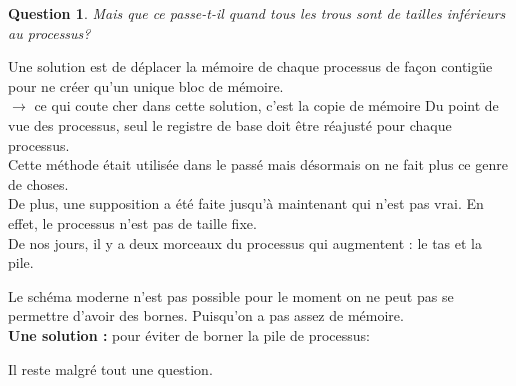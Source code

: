 \documentclass[12pt,a4paper]{report}
\newtheorem*{q}{Question}
\begin{document}
\begin{q}Mais que ce passe-t-il quand tous les trous sont de tailles inférieurs au processus?\end{q}
Une solution est de déplacer la mémoire de chaque processus de façon contigüe pour ne créer qu'un unique bloc de mémoire.\\
$\rightarrow$ ce qui coute cher dans cette solution, c'est la copie de mémoire  Du point de vue des processus, seul le registre de base doit être réajusté pour chaque processus.\\
Cette méthode était utilisée dans le passé mais désormais on
ne fait plus ce genre de choses.\\

De plus, une supposition a été faite jusqu'à maintenant qui n'est pas vrai. En effet, le processus n'est pas de taille fixe.\\
De nos jours, il y a deux morceaux du processus qui augmentent : le tas et la pile. \\

\begin{center}
\end{center}

Le schéma moderne n'est pas possible pour le moment on ne peut pas se permettre d'avoir des bornes. Puisqu'on a pas assez de mémoire.\\
\textbf{Une solution :} pour éviter de borner la pile de processus:

\begin{center}
\end{center}
Il reste malgré tout une question.\\
\end{document}

